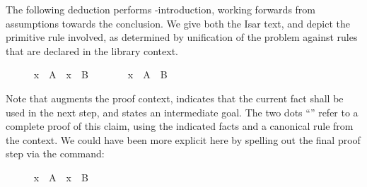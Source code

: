 \begin{isabellebody}
\begin{isamarkuptext}
  \medskip The following deduction performs \isa{{\isachardoublequote}{\isasyminter}{\isachardoublequote}}-introduction,
  working forwards from assumptions towards the conclusion.  We give
  both the Isar text, and depict the primitive rule involved, as
  determined by unification of the problem against rules that are
  declared in the library context.%
\end{isamarkuptext}%
\isamarkuptrue%
%
\medskip\begin{minipage}{0.6\textwidth}
%
\isadelimproof
%
\endisadelimproof
%
\isatagproof
\ \ \ \ \isamarkupfalse%
\ {\isachardoublequoteopen}x\ {\isasymin}\ A{\isachardoublequoteclose}\ \ {\isachardoublequoteopen}x\ {\isasymin}\ B{\isachardoublequoteclose}\isanewline
\ \ \ \ \isamarkupfalse%
\ \isamarkupfalse%
\ {\isachardoublequoteopen}x\ {\isasymin}\ A\ {\isasyminter}\ B{\isachardoublequoteclose}\ \isacommand{{\isachardot}{\isachardot}}\isamarkupfalse%
%
\endisatagproof
{\isafoldproof}%
%
\isadelimproof
%
\endisadelimproof
%
\end{minipage}\begin{minipage}{0.4\textwidth}
%
\begin{isamarkuptext}%
%
\end{isamarkuptext}%
\isamarkuptrue%
%
\end{minipage}
%
\begin{isamarkuptext}%
\medskip\noindent Note that \hyperlink{command.assume}{\mbox{}} augments the proof
  context, \hyperlink{command.then}{\mbox{}} indicates that the current fact shall be
  used in the next step, and \hyperlink{command.have}{\mbox{}} states an intermediate
  goal.  The two dots ``\hyperlink{command.ddot}{\mbox{\isa{\isacommand{{\isachardot}{\isachardot}}}}}'' refer to a complete proof of
  this claim, using the indicated facts and a canonical rule from the
  context.  We could have been more explicit here by spelling out the
  final proof step via the \hyperlink{command.by}{\mbox{}} command:%
\end{isamarkuptext}%
\isamarkuptrue%
%
\isadelimproof
%
\endisadelimproof
%
\isatagproof
\ \ \ \ \isamarkupfalse%
\ {\isachardoublequoteopen}x\ {\isasymin}\ A{\isachardoublequoteclose}\ \ {\isachardoublequoteopen}x\ {\isasymin}\ B{\isachardoublequoteclose}\isanewline

\end{isabellebody}
